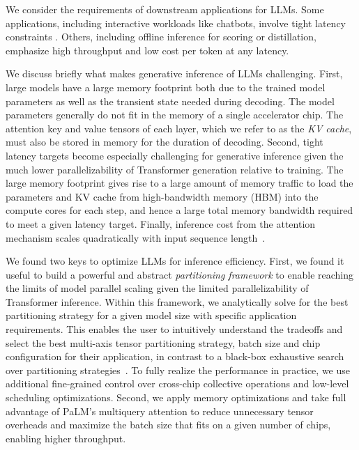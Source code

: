 We consider the requirements of downstream applications for LLMs. Some applications, including interactive workloads like chatbots, involve tight latency constraints \cite{thoppilan2022lamda}. Others, including offline inference for scoring or distillation, emphasize high throughput and low cost per token at any latency.

We discuss briefly what makes generative inference of LLMs challenging. First, large models have a large memory footprint both due to the trained model parameters as well as the transient state needed during decoding.  The model parameters generally do not fit in the memory of a single accelerator chip.  The attention key and value tensors of each layer, which we refer to as the \emph{KV cache}, must also be stored in memory for the duration of decoding. Second, tight latency targets become especially challenging for generative inference given the much lower parallelizability of Transformer generation relative to training. The large memory footprint gives rise to a large amount of memory traffic to load the parameters and KV cache from high-bandwidth memory (HBM) into the compute cores for each step, and hence a large total memory bandwidth required to meet a given latency target. Finally, inference cost from the attention mechanism scales quadratically with input sequence length~\cite{sukhbaatar2019adaptive,choromanski2020rethinking, dao2022flashattention}. 

We found two keys to optimize LLMs for inference efficiency. First, we found it useful to build a powerful and abstract \textit{partitioning framework} to enable reaching the limits of model parallel scaling given the limited parallelizability of Transformer inference. Within this framework, we analytically solve for the best partitioning strategy for a given model size with specific application requirements. This enables the user to intuitively understand the tradeoffs and select the best multi-axis tensor partitioning strategy, batch size and chip configuration for their application, in contrast to a black-box exhaustive search over partitioning strategies~\cite{zheng2022alpa, xu2021gspmd}. To fully realize the performance in practice, we use additional fine-grained control over cross-chip collective operations and low-level scheduling optimizations. Second, we apply memory optimizations and take full advantage of PaLM's multiquery attention to reduce unnecessary tensor overheads and maximize the batch size that fits on a given number of chips, enabling higher throughput. 

